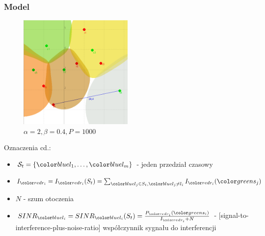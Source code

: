 \documentclass[polish, t,10pt]{beamer}
\begin{document}
    \begin{frame}
        \frametitle{Model}
        \begin{figure}
            \includegraphics[width=0.5\textwidth]{pictures/model-diagram2.png}
            \caption{$\alpha=2, \beta=0.4, P=1000$}
        \end{figure}
        Oznaczenia cd.:
        \begin{itemize}
            \item $\mathcal{S}_t = \{\lo, \ldots, \lm\}$ - jeden przedział czasowy
            \item $I_{\ri} = I_{\ri}(S_t) = \sum_{\lj \in S_t, \lj \neq l_i} I_{\ri}(\sj)$
            \item $N$ - szum otoczenia
            \item $SINR_{\li} = SINR_{\li}(S_t) = \frac{P_{\ri}(\si)}{I_{\ri} + N}$ - [signal-to-interference-plus-noise-ratio] współczynnik sygnału do interferencji
        \end{itemize}
    \end{frame}
\end{document}
